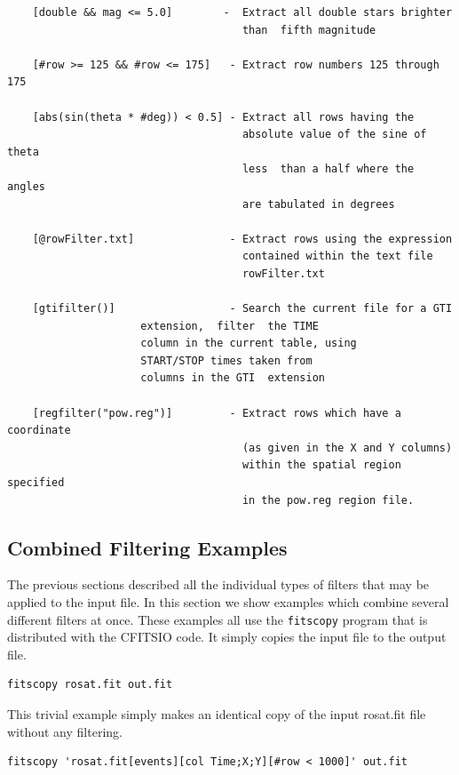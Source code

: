 \documentclass[11pt]{article}
\begin{document}
\begin{verbatim}
    [double && mag <= 5.0]        -  Extract all double stars brighter
                                     than  fifth magnitude

    [#row >= 125 && #row <= 175]   - Extract row numbers 125 through 175

    [abs(sin(theta * #deg)) < 0.5] - Extract all rows having the
                                     absolute value of the sine of theta
                                     less  than a half where the angles
                                     are tabulated in degrees

    [@rowFilter.txt]               - Extract rows using the expression
                                     contained within the text file
                                     rowFilter.txt

    [gtifilter()]                  - Search the current file for a GTI
				     extension,  filter  the TIME
				     column in the current table, using
				     START/STOP times taken from
				     columns in the GTI  extension

    [regfilter("pow.reg")]         - Extract rows which have a coordinate
                                     (as given in the X and Y columns)
                                     within the spatial region specified
                                     in the pow.reg region file.
\end{verbatim}

\newpage
\subsection{Combined Filtering Examples}

The previous sections described all the individual types of filters
that may be applied to the input file.  In this section we show
examples which combine several different filters at once.  These
examples all use the {\tt fitscopy} program that is distributed with
the CFITSIO code.  It simply copies the input file to the output file.

\begin{verbatim}
fitscopy rosat.fit out.fit
\end{verbatim}

This trivial example simply makes an identical copy of the input
rosat.fit file without any filtering.

\begin{verbatim}
fitscopy 'rosat.fit[events][col Time;X;Y][#row < 1000]' out.fit
\end{verbatim}
\end{document}
